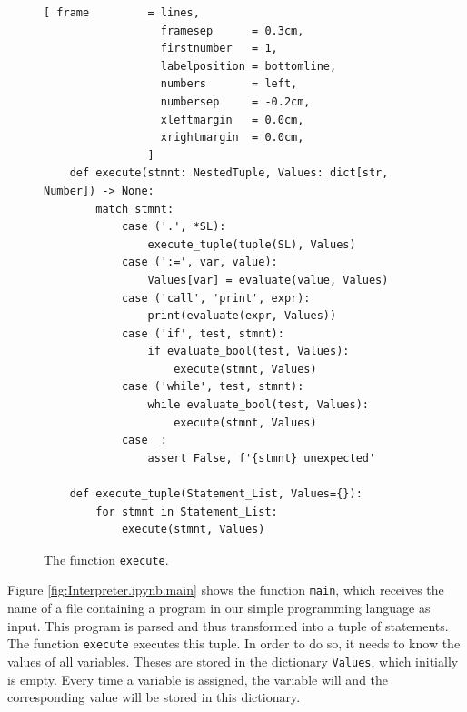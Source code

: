 \begin{figure}[!ht]
\centering
\begin{Verbatim}[ frame         = lines, 
                  framesep      = 0.3cm, 
                  firstnumber   = 1,
                  labelposition = bottomline,
                  numbers       = left,
                  numbersep     = -0.2cm,
                  xleftmargin   = 0.0cm,
                  xrightmargin  = 0.0cm,
                ]
    def execute(stmnt: NestedTuple, Values: dict[str, Number]) -> None:
        match stmnt:
            case ('.', *SL):
                execute_tuple(tuple(SL), Values)
            case (':=', var, value):
                Values[var] = evaluate(value, Values)
            case ('call', 'print', expr):
                print(evaluate(expr, Values))
            case ('if', test, stmnt):
                if evaluate_bool(test, Values):
                    execute(stmnt, Values)
            case ('while', test, stmnt):
                while evaluate_bool(test, Values):
                    execute(stmnt, Values)
            case _:
                assert False, f'{stmnt} unexpected'

    def execute_tuple(Statement_List, Values={}):
        for stmnt in Statement_List:
            execute(stmnt, Values)
\end{Verbatim}
\vspace*{-0.3cm}
\caption{The function \texttt{execute}.}
\label{fig:Interpreter.ipynb:execute}
\end{figure}

Figure \ref{fig:Interpreter.ipynb:main} shows the function \texttt{main}, which receives the name of a
file containing a program in our simple programming language as input. This program is parsed and
thus transformed into a tuple of statements. The function \texttt{execute} executes this tuple.  In order to do
so, it needs to know the values of all variables.  Theses are stored in the dictionary \texttt{Values}, which
initially is empty.  Every time a variable is assigned, the variable will and the corresponding value will be
stored in this dictionary.

